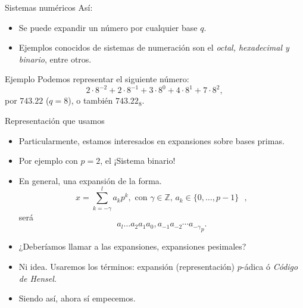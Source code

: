 \documentclass{beamer}
\theoremstyle{definition}
\numberwithin{equation}{section}
\newcommand{\tit}[1]{\textit{#1}}
\newcommand{\Z}{\mathbb{Z}}
\begin{document}
  \begin{frame}{Sistemas numéricos}
  	Así:
  	\begin{itemize}
  		\item Se puede expandir un número por cualquier base $q$.
 		\item Ejemplos conocidos de sistemas de numeración son el \tit{octal, hexadecimal y binario}, entre otros.
  	\end{itemize}
  \begin{exampleblock}{Ejemplo}
	Podemos representar el siguiente número:
	$$2\cdot8^{-2}+2\cdot8^{-1}+3\cdot8^0+4\cdot8^1+7\cdot8^2,$$
	por $743.22$ ($q=8$), o también $743.22_8$.
  \end{exampleblock}
	 
  \end{frame}

\begin{frame}{Representación que usamos}
	\begin{itemize}[<+- | alert@+>]
		\item Particularmente, estamos interesados en expansiones sobre bases primas.
		\item Por ejemplo con $p=2$, el ¡Sistema binario!
		\item En general, una expansión de la forma.	$$x=\sum_{k=-\gamma}^{l}a_kp^k,\text{ con $\gamma\in\Z$, $a_k\in \{0,\dots,p-1\}$ },$$
		será
		\begin{equation}\label{notacion}
		{a_{l} \ldots a_{2} a_{1} a_{0},a_{-1}a_{-2}\cdots a_{-\gamma}}_p.
		\end{equation}
		\item ¿Deberíamos llamar a las expansiones, expansiones pesimales?
		\item Ni idea. Usaremos los términos: expansión (representación) $p$-ádica ó \tit{Código de Hensel}.
		\item Siendo así, ahora sí empecemos.
	\end{itemize}

\end{frame}
\end{document}
